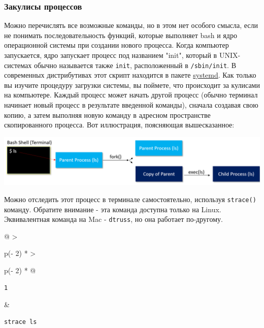 \documentclass{report}
\begin{document}
\hypertarget{Processes-Behind-the-Scenes}{%
\subsubsection{\texorpdfstring{\protect\hyperlink{Processes-Behind-the-Scenes}{}Закулисы
процессов}{Закулисы процессов}}\label{Processes-Behind-the-Scenes}}

Можно перечислять все возможные команды, но в этом нет особого смысла,
если не понимать последовательность функций, которые выполняет bash и
ядро операционной системы при создании нового процесса. Когда компьютер
запускается, ядро запускает процесс под названием "init", который в
UNIX-системах обычно называется также \texttt{init}, расположенный в
\texttt{/sbin/init}. В современных дистрибутивах этот скрипт находится в
пакете \href{https://en.wikipedia.org/wiki/Systemd}{systemd}. Как только
вы изучите процедуру загрузки системы, вы поймете, что происходит за
кулисами на компьютере. Каждый процесс может начать другой процесс
(обычно терминал начинает новый процесс в результате введенной команды),
сначала создавая свою копию, а затем выполняя новую команду в адресном
пространстве скопированного процесса. Вот иллюстрация, поясняющая
вышесказанное:

\includegraphics{blog/2019/bash-essentials/processes-linux.png}

Можно отследить этот процесс в терминале самостоятельно, используя
\texttt{strace()} команду. Обратите внимание - эта команда доступна
только на Linux. Эквивалентная команда на Mac - \texttt{dtruss}, но она
работает по-другому.

\begin{longtable}[]{@{}
  >{\raggedright\arraybackslash}p{(\columnwidth - 2\tabcolsep) * }
  >{\raggedright\arraybackslash}p{(\columnwidth - 2\tabcolsep) * }@{}}
\toprule
\endhead
\begin{minipage}[t]{\linewidth}\raggedright
\begin{verbatim}
1
\end{verbatim}
\end{minipage} & \begin{minipage}[t]{\linewidth}\raggedright
\begin{verbatim}
strace ls
\end{verbatim}
\end{minipage} \\ \addlinespace
\bottomrule
\end{longtable}
\end{document}
